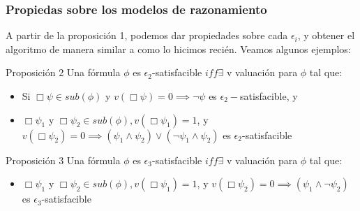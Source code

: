 \documentclass{beamer}
\begin{document}
\begin{frame}
\frametitle{Propiedas sobre los modelos de razonamiento}

A partir de la proposici\'on 1, podemos dar propiedades sobre cada $\epsilon_{i}$, y obtener el algoritmo de manera similar a como lo hicimos reci\'en. Veamos algunos ejemplos:

\begin{block}{Proposici\'on 2}
Una f\'ormula $\phi$ es $\epsilon_{2}$-satisfacible $iff \exists$ v valuaci\'on para $\phi$ tal que: 
\begin{itemize}
\item Si $\Box\psi \in sub(\phi)$ y  $v(\Box \psi) = 0 \implies \neg \psi$ es $\epsilon_{2}-$satisfacible, y 
\item $\Box\psi_{1}$ y $\Box \psi_{2} \in sub(\phi), v(\Box \psi_{1}) = 1$, y $v(\Box \psi_{2}) = 0 \implies (\psi_{1} \land \psi_{2}) \lor (\neg \psi_{1} \land \psi_{2})$ es $\epsilon_{2}$-satisfacible
\end{itemize}
\end{block}

\begin{block}{Proposici\'on 3}
Una f\'ormula $\phi$ es $\epsilon_{3}$-satisfacible $iff \exists$ v valuaci\'on para $\phi$ tal que: 
\begin{itemize}
\item $\Box\psi_{1}$ y $\Box \psi_{2} \in sub(\phi), v(\Box \psi_{1}) = 1$, y $v(\Box \psi_{2}) = 0 \implies (\psi_{1} \land \neg\psi_{2})$ es $\epsilon_{3}$-satisfacible
\end{itemize}
\end{block}
\end{frame}
\end{document}
